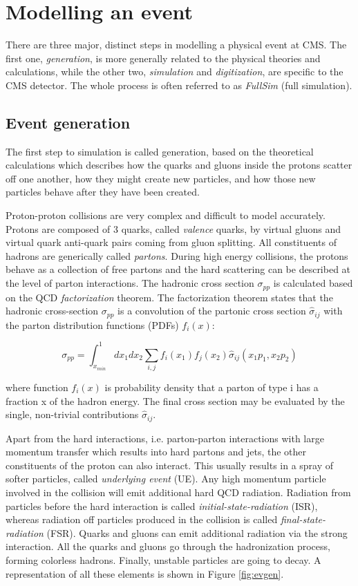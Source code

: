 \section{Modelling an event} \label{sec:modelling}

There are three major, distinct steps in modelling a physical event at CMS. The first one,  \emph{generation}, is more generally related to the physical theories and calculations, while the other two, \emph{simulation} and \emph{digitization}, are specific to the CMS detector. The whole process is often referred to as \emph{FullSim} (full simulation).

\subsection{Event generation}

The first step to simulation is called generation, based on the theoretical calculations which describes how the quarks and gluons inside the protons scatter off one another, how they might create new particles, and how those new particles behave after they have been created. 

Proton-proton collisions are very complex and difficult to model accurately. Protons are
composed of 3 quarks, called \emph{valence} quarks, by virtual gluons and virtual quark anti-quark
pairs coming from gluon splitting. All constituents of hadrons are generically called \emph{partons}.
During high energy collisions, the protons behave as a collection of free partons and the
hard scattering can be described at the level of parton interactions. The hadronic cross
section $\sigma_{pp}$ is calculated based on the QCD \emph{factorization} theorem. The factorization theorem
states that the hadronic cross-section $\sigma_{pp}$ is a convolution of the partonic cross section  $\hat{\sigma}_{ij}$ with the parton distribution functions (PDFs) $f_i(x)$:

\[
\sigma_{pp} = \int_{x_{min}}^1 dx_1 dx_2 \sum_{i,j}f_i(x_1)f_j(x_2)\hat{\sigma}_{ij}(x_1 p_1, x_2 p_2)
\]

where function $f_i(x)$ is probability density that a parton of type i has a fraction x of the
hadron energy. The final cross section may be evaluated by the single, non-trivial contributions $\hat{\sigma}_{ij}$.

Apart from the hard interactions, i.e. parton-parton interactions with large momentum transfer which results into hard partons and jets, the other constituents of the proton can also interact. This
usually results in a spray of softer particles, called \emph{underlying event} (UE). Any high momentum particle involved in the collision will emit additional hard QCD radiation. Radiation
from particles before the hard interaction is called \emph{initial-state-radiation} (ISR), whereas radiation off particles produced in the collision is called \emph{final-state-radiation} (FSR). Quarks and gluons can emit additional radiation via the strong interaction. All the quarks
and gluons go through the hadronization process, forming colorless hadrons. Finally, unstable particles are going to decay. A representation of all these elements is shown in Figure \ref{fig:evgen}.          

